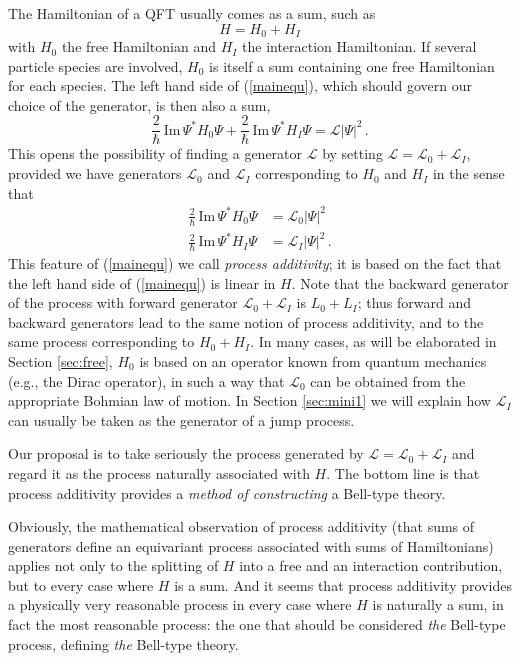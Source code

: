 \documentclass[12pt]{article}
\newcommand{\1}{\mathbf{1}} %
\renewcommand{\Im}{\mathrm{Im}} %
\newcommand{\generator}{\mathscr{L}} %
\newcommand{\inter}{{I}} %
\begin{document}
The Hamiltonian of a QFT usually comes as a sum, such as
\begin{equation}\label{Hsum}
   H = H_0 + H_\inter
\end{equation}
with $H_0$ the free Hamiltonian and $H_\inter$ the interaction
Hamiltonian. If several particle species are involved, $H_0$ is itself
a sum containing one free Hamiltonian for each species. The left hand
side of (\ref{mainequ}), which should govern our choice of the
generator, is then also a sum,
\begin{equation}\label{Hsumgen}
   \frac{2}{\hbar} \, \Im \, \Psi^* H_0 \Psi + \frac{2}{\hbar} \, \Im
   \, \Psi^* H_\inter \Psi = \generator |\Psi|^2\,.
\end{equation}
This opens the possibility of finding a generator $\generator$ by
setting $\generator = \generator_0 + \generator_\inter$, provided we
have generators $\generator_0$ and $\generator_\inter$
corresponding to $H_0$ and $H_\inter$ in the sense that
\begin{subequations}
\begin{align}
   \frac{2}{\hbar} \, \Im \, \Psi^* H_0 \Psi
   &= \generator_0 |\Psi|^2 \\
   \frac{2}{\hbar} \, \Im \, \Psi^* H_\inter \Psi
   &= \generator_\inter |\Psi|^2\,.
\end{align}
\end{subequations}
This feature of (\ref{mainequ}) we call \emph{process additivity}; it
is based on the fact that the left hand side of (\ref{mainequ}) is
linear in $H$.  Note that the backward generator of the process with
forward generator $\generator_0 + \generator_\inter$ is $L_0 +
L_\inter$; thus forward and backward generators lead to the same
notion of process additivity, and to the same process corresponding to
$H_0 + H_\inter$.  In many cases, as will be elaborated in Section
\ref{sec:free}, $H_0$ is based on an operator known from quantum
mechanics (e.g., the Dirac operator), in such a way that
$\generator_0$ can be obtained from the appropriate Bohmian law of
motion. In Section \ref{sec:mini1} we will explain how
$\generator_\inter$ can usually be taken as the generator of a jump
process.

Our proposal is to take seriously the process generated by $\generator
= \generator_0 + \generator_\inter$ and regard it as the process
naturally associated with $H$. The bottom line is that process
additivity provides a \emph{method of constructing} a Bell-type
theory.

Obviously, the mathematical observation of process additivity (that
sums of generators define an equivariant process associated with sums
of Hamiltonians) applies not only to the splitting of $H$ into a free
and an interaction contribution, but to every case where $H$ is a sum.
And it seems  that process additivity provides a physically very
reasonable process in every case where $H$ is naturally a sum, in fact
the most reasonable process: the one that should be considered
\emph{the} Bell-type process, defining \emph{the} Bell-type theory.
\end{document}
